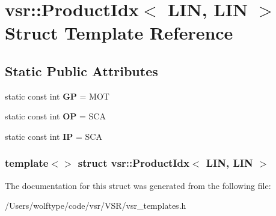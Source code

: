 \hypertarget{structvsr_1_1_product_idx_3_01_l_i_n_00_01_l_i_n_01_4}{\section{vsr\-:\-:Product\-Idx$<$ L\-I\-N, L\-I\-N $>$ Struct Template Reference}
\label{structvsr_1_1_product_idx_3_01_l_i_n_00_01_l_i_n_01_4}
}
\subsection*{Static Public Attributes}
\begin{DoxyCompactItemize}
\item 
\hypertarget{structvsr_1_1_product_idx_3_01_l_i_n_00_01_l_i_n_01_4_a1bb9d7d1050efa8108347335979888e0}{static const int {\bfseries G\-P} = M\-O\-T}\label{structvsr_1_1_product_idx_3_01_l_i_n_00_01_l_i_n_01_4_a1bb9d7d1050efa8108347335979888e0}

\item 
\hypertarget{structvsr_1_1_product_idx_3_01_l_i_n_00_01_l_i_n_01_4_a1dd50e34c42d29c8cbe72a9c5026bdbd}{static const int {\bfseries O\-P} = S\-C\-A}\label{structvsr_1_1_product_idx_3_01_l_i_n_00_01_l_i_n_01_4_a1dd50e34c42d29c8cbe72a9c5026bdbd}

\item 
\hypertarget{structvsr_1_1_product_idx_3_01_l_i_n_00_01_l_i_n_01_4_ae16c3c9ad0782b3acb19cdcabdb5ad23}{static const int {\bfseries I\-P} = S\-C\-A}\label{structvsr_1_1_product_idx_3_01_l_i_n_00_01_l_i_n_01_4_ae16c3c9ad0782b3acb19cdcabdb5ad23}

\end{DoxyCompactItemize}
\subsubsection*{template$<$$>$ struct vsr\-::\-Product\-Idx$<$ L\-I\-N, L\-I\-N $>$}



The documentation for this struct was generated from the following file\-:\begin{DoxyCompactItemize}
\item 
/\-Users/wolftype/code/vsr/\-V\-S\-R/vsr\-\_\-templates.\-h\end{DoxyCompactItemize}
